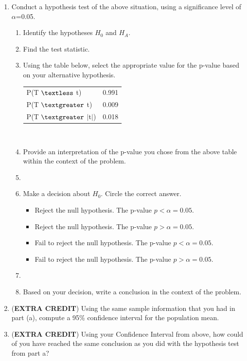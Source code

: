   \begin{enumerate}
  \item Conduct a hypothesis test of the above situation, using a significance level of $\alpha$=0.05.
    \begin{enumerate}
    \item Identify the hypotheses $H_0$ and $H_A$.
         \vspace{0.3cm}   
    \item Find the test statistic.


\vspace{0.3cm}
\item Using the table below, select the appropriate value for the p-value based on your alternative hypothesis.
\begin{table}[h]
\centering
\begin{tabular}{l|l}
	\hline
	P(T $\textless$ t) & 0.991 \\
	P(T $\textgreater$ t) & 0.009 \\
	P(T $\textgreater$ $|$t$|$) & 0.018 \\
	\hline
\end{tabular}
\end{table}
\\
    \item  Provide an interpretation of the p-value you chose from the above table within the context of the problem.
\item[]
    \item Make a decision about $H_{0}$. Circle the correct answer.
      \begin{itemize}
      \item Reject the null hypothesis. The p-value $p < \alpha = 0.05$.
      \item Reject the null hypothesis. The p-value  $p > \alpha = 0.05$.
      \item Fail to reject the null hypothesis. The p-value $p < \alpha = 0.05$.
      \item Fail to reject the null hypothesis. The p-value  $p > \alpha = 0.05$.
      \end{itemize}
\item[]
    \item   Based on your decision, write a conclusion in the context of the problem.
    \end{enumerate}
  \item  (\textbf{EXTRA CREDIT})  Using the same sample information that you had in part (a), compute a 95\% confidence interval for the population mean.
  \item (\textbf{EXTRA CREDIT}) Using your Confidence Interval from above, how could of you have reached the same conclusion as you did with the hypothesis test from part a?

  \end{enumerate}